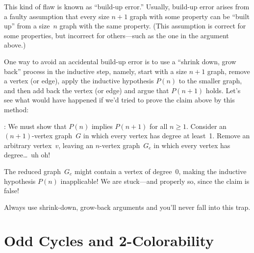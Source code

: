 This kind of flaw is known as ``build-up error.''  Usually, build-up
error arises from a faulty assumption that every size $n + 1$ graph
with some property can be ``built up'' from a size~$n$ graph with the
same property.  (This assumption is correct for some properties, but
incorrect for others---such as the one in the argument above.)

One way to avoid an accidental build-up error is to use a ``shrink
down, grow back'' process in the inductive step, namely, start with a
size $n+1$ graph, remove a vertex (or edge), apply the inductive
hypothesis $P(n)$ to the smaller graph, and then add back the vertex
(or edge) and argue that $P(n + 1)$ holds.  Let's see what would have
happened if we'd tried to prove the claim above by this method:

: We must show that $P(n)$
implies $P(n + 1)$ for all $n \ge 1$.  Consider an $(n + 1)$-vertex
graph~$G$ in which every vertex has degree at least~1.  Remove an
arbitrary vertex~$v$, leaving an $n$-vertex graph~$G_e$ in which every
vertex has degree\dots\ uh oh!

The reduced graph~$G_e$ might contain a vertex of degree~0, making the
inductive hypothesis $P(n)$ inapplicable!  We are stuck---and
properly so, since the claim is false!

Always use shrink-down, grow-back arguments and you'll never fall into
this trap.


\fi

\begin{problems}
\classproblems
{}

\homeworkproblems
{}


\homeworkproblems
{}
\end{problems}

\section{Odd Cycles and 2-Colorability}\label{subsec:odd_cycles}

